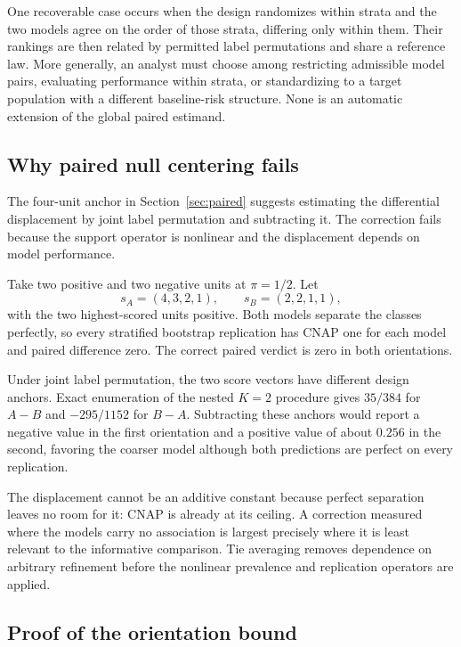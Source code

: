 \documentclass[11pt]{article}
\theoremstyle{remark}
\begin{document}
One recoverable case occurs when the design randomizes within strata and the two models agree on the order of those strata, differing only within them. Their rankings are then related by permitted label permutations and share a reference law. More generally, an analyst must choose among restricting admissible model pairs, evaluating performance within strata, or standardizing to a target population with a different baseline-risk structure. None is an automatic extension of the global paired estimand.

\subsection{Why paired null centering fails}

The four-unit anchor in Section~\ref{sec:paired} suggests estimating the differential displacement by joint label permutation and subtracting it. The correction fails because the support operator is nonlinear and the displacement depends on model performance.

Take two positive and two negative units at $\pi=1/2$. Let
\[
s_A=(4,3,2,1),
\qquad
s_B=(2,2,1,1),
\]
with the two highest-scored units positive. Both models separate the classes perfectly, so every stratified bootstrap replication has CNAP one for each model and paired difference zero. The correct paired verdict is zero in both orientations.

Under joint label permutation, the two score vectors have different design anchors. Exact enumeration of the nested $K=2$ procedure gives $35/384$ for $A-B$ and $-295/1152$ for $B-A$. Subtracting these anchors would report a negative value in the first orientation and a positive value of about $0.256$ in the second, favoring the coarser model although both predictions are perfect on every replication.

The displacement cannot be an additive constant because perfect separation leaves no room for it: CNAP is already at its ceiling. A correction measured where the models carry no association is largest precisely where it is least relevant to the informative comparison. Tie averaging removes dependence on arbitrary refinement before the nonlinear prevalence and replication operators are applied.

\subsection{Proof of the orientation bound}
\end{document}
